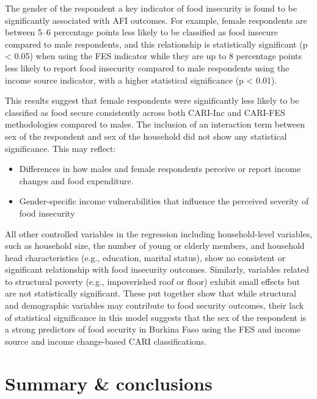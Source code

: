 \documentclass[11pt,harvard]{article}
\begin{document}
	The gender of the respondent a key indicator of food insecurity is found to be significantly associated with AFI outcomes. For example, female respondents are between 5–6 percentage points less likely to be classified as food insecure compared to male respondents, and this relationship is statistically significant (p < 0.05) when using the FES indicator while they are up to 8 percentage points less likely to report food insecurity compared to male respondents using the income source indicator, with a higher statistical significance (p < 0.01).
	
	This results suggest that female respondents were significantly less likely to be classified as food secure consistently across both CARI-Inc and CARI-FES methodologies compared to males. The inclusion of an interaction term between sex of the respondent and sex of the household did not show any statistical significance. This may reflect:
	\begin{itemize}
	\item Differences in how males and female respondents perceive or report income changes and food expenditure.
	\item Gender-specific income vulnerabilities that influence the perceived severity of food insecurity
	\end{itemize}
	All other controlled variables in the regression including household-level variables, such as household size, the number of young or elderly members, and household head characteristics (e.g., education, marital status), show no consistent or significant relationship with food insecurity outcomes.	Similarly, variables related to structural poverty (e.g., impoverished roof or floor) exhibit small effects but are not statistically significant. These put together show that while structural and demographic variables may contribute to food security outcomes, their lack of statistical significance in this model suggests that the sex of the respondent is a strong predictors of food security in Burkina Faso using the FES and income source and income change-based CARI classifications.
	
	
	\pagebreak
	
	
	\section{Summary \& conclusions}
	
\end{document}

